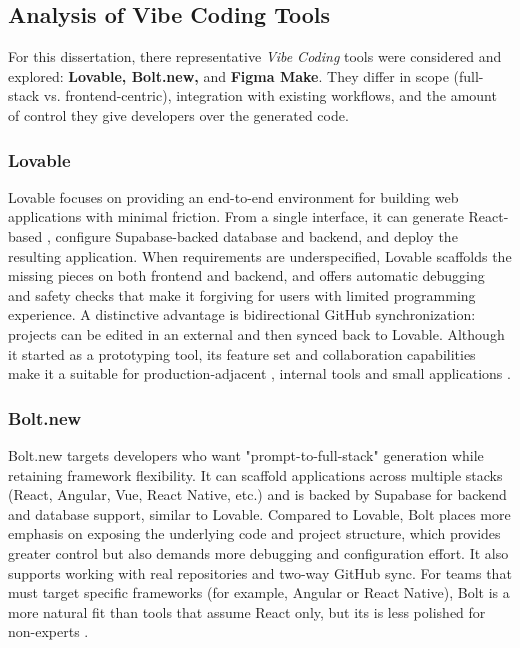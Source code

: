     \subsection{Analysis of Vibe Coding Tools}
        {
            For this dissertation, there representative \textit{Vibe Coding} tools were considered and explored: \textbf{Lovable, Bolt.new, } and \textbf{Figma Make}.
            They differ in scope (full-stack vs. frontend-centric), integration with existing workflows, and the amount of control they give developers over the generated code. 
        }

        \subsubsection*{Lovable}
            { 
                    Lovable focuses on providing an end-to-end environment for building web applications with minimal friction. 
                    From a single interface, it can generate React-based , configure Supabase-backed database and backend,
                    and deploy the resulting application.
                    When requirements are underspecified, Lovable scaffolds the missing pieces on both frontend and backend, and offers automatic debugging
                    and safety checks that make it forgiving for users with limited programming experience. A distinctive advantage is bidirectional GitHub
                    synchronization: projects can be edited in an external  and then synced back to Lovable.
                    Although it started as a prototyping tool, its feature set and collaboration capabilities make it a suitable for production-adjacent , internal tools and small applications \cite{medioum-choosing-ai-tools}.
                }
        \subsubsection*{Bolt.new}
            {
                    Bolt.new targets developers who want "prompt-to-full-stack" generation while retaining framework flexibility. 
                    It can scaffold applications across multiple stacks (React, Angular, Vue, React Native, etc.) and is backed by Supabase
                    for backend and database support, similar to Lovable.
                    Compared to Lovable, Bolt places more emphasis on exposing the underlying code and project structure, which provides greater control but also 
                    demands more debugging and configuration effort. 
                    It also supports working with real repositories and two-way GitHub sync. 
                    For teams that must target specific frameworks (for example, Angular or React Native), Bolt is a more natural fit than tools that assume React only, but its
                     is less polished for non-experts \cite{medioum-choosing-ai-tools}.
                }
